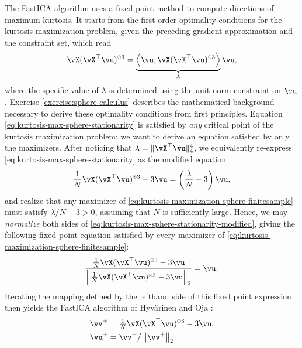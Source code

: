 \documentclass[../../book-main.tex]{subfiles}
\begin{document}
The FastICA algorithm uses a fixed-point method to compute directions of maximum kurtosis. It starts from the first-order optimality conditions for the kurtosis maximization problem, given the preceding gradient approximation and the constraint set, which read
\begin{align}\label{eq:kurtosis-max-sphere-stationarity}
   \vX (\vX^\top \vu)^{\hada 3} 
   = 
   \underbrace{
   \ip*{\vu}{
   \vX (\vX^\top \vu)^{\hada 3} 
   }}_{\lambda} \vu,
\end{align}
where the specific value of $\lambda$ is determined using the unit norm constraint on $\vu$.
Exercise \ref{exercise:sphere-calculus} describes the mathematical background necessary to derive these optimality conditions from first principles.
Equation \eqref{eq:kurtosis-max-sphere-stationarity} is satisfied by \textit{any} critical point of the kurtosis maximization problem; we want to derive an equation satisfied by only the maximizers.
After noticing that $\lambda = \norm{\vX^\top \vu}_4^4$, we equivalently re-express \eqref{eq:kurtosis-max-sphere-stationarity} as the modified equation
\begin{align}\label{eq:kurtosis-max-sphere-stationarity-modified}
   \frac{1}{N}\vX (\vX^\top \vu)^{\hada 3} 
   - 
   3 \vu
   = 
   \left(
   \frac{\lambda}{N} - 3
   \right)
   \vu,
\end{align}
and realize that any maximizer of \eqref{eq:kurtosis-maximization-sphere-finitesample} 
must satisfy $\lambda / N - 3 > 0$,
assuming that $N$ is sufficiently large.
Hence, we may \textit{normalize} both sides of \eqref{eq:kurtosis-max-sphere-stationarity-modified},
giving the following fixed-point equation satisfied by every maximizer of \eqref{eq:kurtosis-maximization-sphere-finitesample}:
\begin{align}\label{eq:kurtosis-max-sphere-fxp}
\frac{
   \frac{1}{N}\vX (\vX^\top \vu)^{\hada 3} 
   - 
   3 \vu
   }{
   \norm*{
   \frac{1}{N}\vX (\vX^\top \vu)^{\hada 3} 
   - 
   3 \vu
   }_2
   }
   =
   \vu.
\end{align}
Iterating the mapping defined by the lefthand side of this fixed point expression then yields the FastICA algorithm of Hyv\"{a}rinen and Oja \cite{hyvarinen-1997}:
\begin{equation}
\begin{split}\label{eq:fast-ica}
   \vv^+ &= \tfrac{1}{N}\vX (\vX^\top \vu)^{\hada 3}- 3 \vu
   ,  \\
   \vu^+ &= \vv^+ / \norm*{\vv^+}_2.
   \end{split}
\end{equation}
\end{document}
